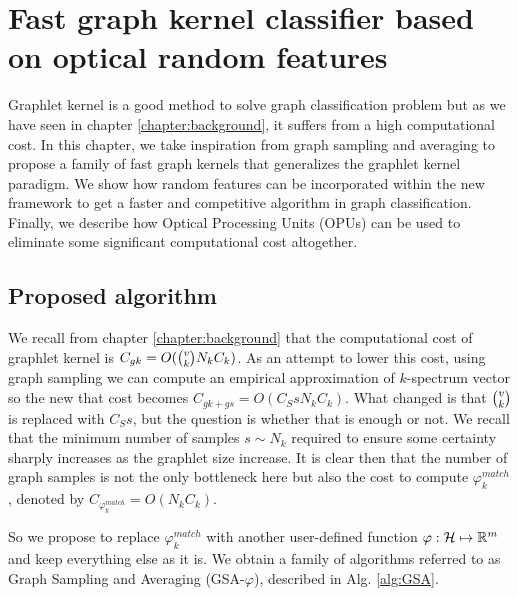 \chapter{Fast graph kernel classifier based on optical random features }
\label{chapter:fast_algorithm}
Graphlet kernel  is a good method to solve graph classification problem but as we have seen in chapter \ref{chapter:background}, it suffers from a high computational cost. In this chapter, we take inspiration from graph sampling and averaging to propose a family of fast graph kernels that generalizes the graphlet kernel paradigm. We show how random features can be incorporated within the new framework to get a faster and competitive algorithm in graph classification. Finally, we describe how Optical Processing Units (OPUs) can be used to eliminate some significant computational cost altogether.

\section{Proposed algorithm}
We recall from chapter \ref{chapter:background} that the computational cost of graphlet kernel is $C_{gk}= O(\tbinom{v}{k} N_k C_k)$. As an attempt to lower this cost, using graph sampling we can compute an empirical approximation of $k$-spectrum vector so the new that cost becomes $C_{gk + gs}= O(C_S s N_k C_k)$. What changed is that $\tbinom{v}{k}$ is replaced with $C_S s$, but the question is whether that is enough or not. We recall that the minimum number of samples $s \sim N_k$ required to ensure some certainty sharply increases as the graphlet size increase. It is clear then that the number of graph samples is not the only bottleneck here but also the cost to compute $\varphi_k^{match}$, denoted by $C_{\varphi_k^{match}}=O(N_k C_k)$.

So we propose to replace $\varphi^{match}_k$ with another user-defined function $\varphi:\mathcal{H} \mapsto\mathbb{R}^m$ and keep everything else as it is. We obtain a family of algorithms referred to as Graph Sampling and Averaging (GSA-$\varphi$), described in Alg. \ref{alg:GSA}.

